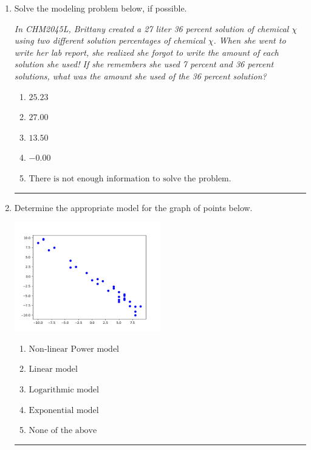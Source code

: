 \documentclass[14pt]{extbook}
\newcommand{\litem}[1]{\item#1\hspace*{-1cm}\rule{\textwidth}{0.4pt}}
\begin{document}
\begin{enumerate}
\litem{
Solve the modeling problem below, if possible.
\begin{center}
    \textit{ In CHM2045L, Brittany created a 27 liter 36 percent solution of chemical $\chi$ using two different solution percentages of chemical $\chi$. When she went to write her lab report, she realized she forgot to write the amount of each solution she used! If she remembers she used 7 percent and 36 percent solutions, what was the amount she used of the 36 percent solution? }
\end{center}
\begin{enumerate}[label=\Alph*.]
\item \( 25.23 \)
\item \( 27.00 \)
\item \( 13.50 \)
\item \( -0.00 \)
\item \( \text{There is not enough information to solve the problem.} \)

\end{enumerate} }
\litem{
Determine the appropriate model for the graph of points below.
\begin{center}
    \includegraphics[width=0.5\textwidth]{../Figures/identifyModelGraph12C.png}
\end{center}
\begin{enumerate}[label=\Alph*.]
\item \( \text{Non-linear Power model} \)
\item \( \text{Linear model} \)
\item \( \text{Logarithmic model} \)
\item \( \text{Exponential model} \)
\item \( \text{None of the above} \)


\end{enumerate}}
\end{enumerate}
\end{document}
